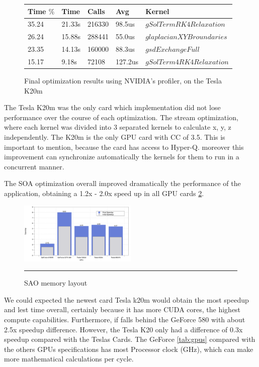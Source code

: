 \begin{figure}[htbp]
	\centering
	  \begin{tabular} { |  l  |  l | l  | l | l |}
	      \hline
	    Time $\%$& Time & Calls & Avg & Kernel \\
    \hline
   35.24 & 21.33s & 216330 & 98.5us & $gSolTermRK4Relaxation$ \\
   \hline
   26.24 & 15.88s & 288441 & 55.0us & $glaplacianXYBroundaries$\\
   \hline
   23.35 & 14.13s & 160000 & 88.3us & $gsdExchangeFull$ \\
   \hline
   15.17 & 9.18s & 72108 & 127.2us & $gSolTerm4RK4Relaxation$\\ 
   \hline
    \end{tabular}
	\caption[Optimization results with the Profiler]{Final optimization results using NVIDIA's profiler, on the Tesla K20m}
	\label{fig:final}
\end{figure}
    
The Tesla K20m was the only card which implementation did not lose performance over the course of each optimization. The stream optimization, where each kernel was divided into 3 separated kernels to calculate x, y, z independently. The K20m is the only GPU card with CC of 3.5. This is important to mention, because the card has access to Hyper-Q. moreover this improvement can synchronize automatically the kernels for them to run in a concurrent manner. 

The SOA optimization overall improved dramatically the performance of the application, obtaining a 1.2x - 2.0x speed up in all GPU cards \ref{fig:speedup}.

\begin{figure}[htbp]
	\centering
		\includegraphics[width=0.5\textwidth]{Figures/speed.png}
		\rule{35em}{0.2pt}
	\caption[Structure of Arrays (SAO)]{SAO memory layout}
	\label{fig:speedup}
\end{figure}


We could expected the newest card Tesla k20m would obtain the most speedup and lest time overall,  certainly because it has more CUDA cores, the highest compute capabilities. Furthermore, if falls behind the GeForce 580 with about 2.5x speedup difference. However, the Tesla K20 only had a difference of 0.3x speedup compared with the Teslas Cards. The GeForce \ref{tab:gpus} compared with the others GPUs specifications has most Processor clock (GHz), which can make more mathematical calculations per cycle.

